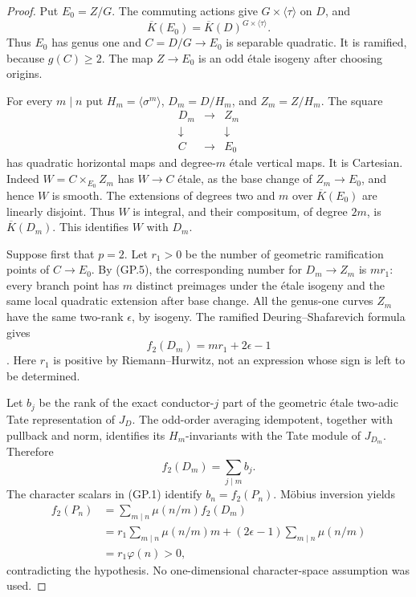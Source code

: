 \begin{proof}
Put $E_0=Z/G$. The commuting actions give
$G\times\langle\tau\rangle$ on $D$, and
\[
 \overline K(E_0)
       =\overline K(D)^{G\times\langle\tau\rangle}.
\]
Thus $E_0$ has genus one and $C=D/G\to E_0$
is separable quadratic. It is ramified,
because $g(C)\ge2$. The map $Z\to E_0$ is
an odd \'etale isogeny after choosing origins.

For every $m\mid n$ put
$H_m=\langle\sigma^m\rangle$,
$D_m=D/H_m$, and $Z_m=Z/H_m$. The square
\[
 \begin{array}{ccc}
 D_m&\longrightarrow&Z_m\\
 \downarrow&&\downarrow\\
 C&\longrightarrow&E_0
 \end{array}                                              \tag{GP.5}
\]
has quadratic horizontal maps and degree-$m$
\'etale vertical maps. It is Cartesian.
Indeed $W=C\times_{E_0}Z_m$ has $W\to C$
\'etale, as the base change of $Z_m\to E_0$,
and hence $W$ is smooth. The extensions of
degrees two and $m$ over $\overline K(E_0)$
are linearly disjoint. Thus $W$ is integral,
and their compositum, of degree $2m$, is
$\overline K(D_m)$. This identifies $W$ with
$D_m$.

Suppose first that $p=2$. Let $r_1>0$ be
the number of geometric ramification points
of $C\to E_0$. By (GP.5), the corresponding
number for $D_m\to Z_m$ is $m r_1$:
every branch point has $m$ distinct preimages
under the \'etale isogeny and the same local
quadratic extension after base change.
All the genus-one curves $Z_m$ have the
same two-rank $\epsilon$, by isogeny.
The ramified Deuring--Shafarevich formula gives
\[
                       f_2(D_m)=m r_1+2\epsilon-1
                                                               \tag{GP.6}
\]
\citep[Corollary 1.8, pp.~35--36]{A_PrimCrew1984}.
Here $r_1$ is positive by Riemann--Hurwitz,
not an expression whose sign is left to
be determined.

Let $b_j$ be the rank of the exact
conductor-$j$ part of the geometric \'etale
two-adic Tate representation of $J_D$.
The odd-order averaging idempotent, together
with pullback and norm, identifies its
$H_m$-invariants with the Tate module of
$J_{D_m}$. Therefore
\[
                          f_2(D_m)=\sum_{j\mid m}b_j.
\]
The character scalars in (GP.1) identify
$b_n=f_2(P_n)$. M\"obius inversion yields
\[
 \begin{aligned}
 f_2(P_n)
 &=\sum_{m\mid n}\mu(n/m)f_2(D_m)\\
 &=r_1\sum_{m\mid n}\mu(n/m)m
   +(2\epsilon-1)\sum_{m\mid n}\mu(n/m)\\
 &=r_1\varphi(n)>0,
 \end{aligned}                                             \tag{GP.7}
\]
contradicting the hypothesis. No
one-dimensional character-space assumption
was used.


\end{proof}
